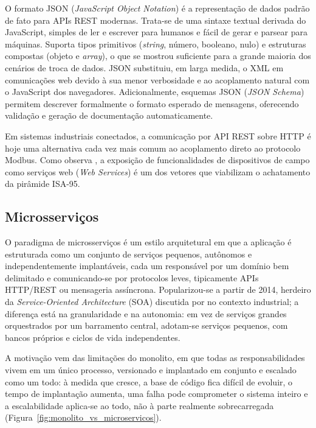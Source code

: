 \par O formato JSON (\emph{JavaScript Object Notation}) é a representação de dados padrão de fato para APIs REST modernas. Trata-se de uma sintaxe textual derivada do JavaScript, simples de ler e escrever para humanos e fácil de gerar e parsear para máquinas. Suporta tipos primitivos (\emph{string}, número, booleano, nulo) e estruturas compostas (objeto e \emph{array}), o que se mostrou suficiente para a grande maioria dos cenários de troca de dados. JSON substituiu, em larga medida, o XML em comunicações web devido à sua menor verbosidade e ao acoplamento natural com o JavaScript dos navegadores. Adicionalmente, esquemas JSON (\emph{JSON Schema}) permitem descrever formalmente o formato esperado de mensagens, oferecendo validação e geração de documentação automaticamente.

\par Em sistemas industriais conectados, a comunicação por API REST sobre HTTP é hoje uma alternativa cada vez mais comum ao acoplamento direto ao protocolo Modbus. Como observa \textcite{COLOMBO2014_STATE_ART_AUTOMATION}, a exposição de funcionalidades de dispositivos de campo como serviços web (\emph{Web Services}) é um dos vetores que viabilizam o achatamento da pirâmide ISA-95.

\subsection{Microsserviços}

\par O paradigma de microsserviços é um estilo arquitetural em que a aplicação é estruturada como um conjunto de serviços pequenos, autônomos e independentemente implantáveis, cada um responsável por um domínio bem delimitado e comunicando-se por protocolos leves, tipicamente APIs HTTP/REST ou mensageria assíncrona. Popularizou-se a partir de 2014, herdeiro da \emph{Service-Oriented Architecture} (SOA) discutida por \textcite{COLOMBO2014_STATE_ART_AUTOMATION} no contexto industrial; a diferença está na granularidade e na autonomia: em vez de serviços grandes orquestrados por um barramento central, adotam-se serviços pequenos, com bancos próprios e ciclos de vida independentes.

\par A motivação vem das limitações do monolito, em que todas as responsabilidades vivem em um único processo, versionado e implantado em conjunto e escalado como um todo: à medida que cresce, a base de código fica difícil de evoluir, o tempo de implantação aumenta, uma falha pode comprometer o sistema inteiro e a escalabilidade aplica-se ao todo, não à parte realmente sobrecarregada (Figura~\ref{fig:monolito_vs_microservicos}).

